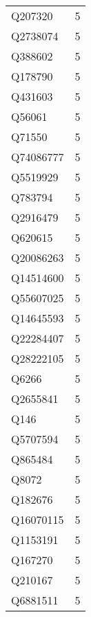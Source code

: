 \begin{tabular}{lr}
     Q207320 &                             5 \\
    Q2738074 &                             5 \\
     Q388602 &                             5 \\
     Q178790 &                             5 \\
     Q431603 &                             5 \\
      Q56061 &                             5 \\
      Q71550 &                             5 \\
   Q74086777 &                             5 \\
    Q5519929 &                             5 \\
     Q783794 &                             5 \\
    Q2916479 &                             5 \\
     Q620615 &                             5 \\
   Q20086263 &                             5 \\
   Q14514600 &                             5 \\
   Q55607025 &                             5 \\
   Q14645593 &                             5 \\
   Q22284407 &                             5 \\
   Q28222105 &                             5 \\
       Q6266 &                             5 \\
    Q2655841 &                             5 \\
        Q146 &                             5 \\
    Q5707594 &                             5 \\
     Q865484 &                             5 \\
       Q8072 &                             5 \\
     Q182676 &                             5 \\
   Q16070115 &                             5 \\
    Q1153191 &                             5 \\
     Q167270 &                             5 \\
     Q210167 &                             5 \\
    Q6881511 &                             5 \\

\end{tabular}
